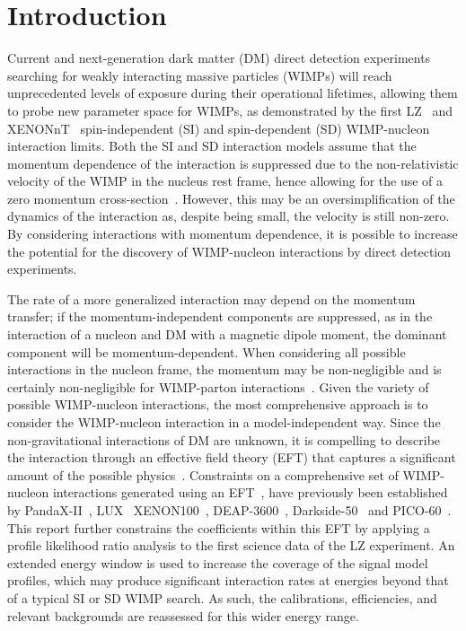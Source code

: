 \documentclass[reprint, showpacs,
preprintnumbers,
amsmath,amssymb,
aps, floatfix,
superscriptaddress,
prd, nofootinbib]{revtex4-1}
\begin{document}
\section{\label{sec:introduction}Introduction}
Current and next-generation dark matter (DM) direct detection experiments searching for weakly interacting massive particles (WIMPs) will reach unprecedented levels of exposure during their operational lifetimes, allowing them to probe new parameter space for WIMPs, as demonstrated by the first LZ~\cite{LZ:SR1WS_2022} and XENONnT~\cite{XenonNT:WS_2023} spin-independent (SI) and spin-dependent (SD) WIMP-nucleon interaction limits. 
Both the SI and SD interaction models assume that the momentum dependence of the interaction is suppressed due to the non-relativistic velocity of the WIMP in the nucleus rest frame, hence allowing for the use of a zero momentum cross-section~\cite{JUNGMAN:Supersymmetric_dark_matter}. 
However, this may be an oversimplification of the dynamics of the interaction as, despite being small, the velocity is still non-zero.
By considering interactions with momentum dependence, it is possible to increase the potential for the discovery of WIMP-nucleon interactions by direct detection experiments.
\par
The rate of a more generalized interaction may depend on the momentum transfer; if the momentum-independent components are suppressed, as in the interaction of a nucleon and DM with a magnetic dipole moment, the dominant component will be momentum-dependent.
When considering all possible interactions in the nucleon frame, the momentum may be non-negligible and is certainly non-negligible for WIMP-parton interactions~\cite{Hisano:2017jmz}.
Given the variety of possible WIMP-nucleon interactions, the most comprehensive approach is to consider the WIMP-nucleon interaction in a model-independent way. 
Since the non-gravitational interactions of DM are unknown, it is compelling to describe the interaction through an effective field theory (EFT) that captures a significant amount of the possible physics~\cite{georgi:EFT}.
Constraints on a comprehensive set of WIMP-nucleon interactions generated using an EFT~\cite{Fan_2010, Fitzpatrick:EFT}, have previously been established by PandaX-II~\cite{PandaX2:SD_EFT_2019}, LUX~\cite{LUX:EFTR4_2021} XENON100~\cite{Xenon100:EFT_2017}, DEAP-3600~\cite{DEAP:eft_2020}, Darkside-50~\cite{DarkSide-50:eft_2020} and PICO-60~\cite{PICO:photonM_2022}.
This report further constrains the coefficients within this EFT by applying a profile likelihood ratio analysis to the first science data of the LZ experiment.
An extended energy window is used to increase the coverage of the signal model profiles, which may produce significant interaction rates at energies beyond that of a typical SI or SD WIMP search. 
As such, the calibrations, efficiencies, and relevant backgrounds are reassessed for this wider energy range.
\end{document}
